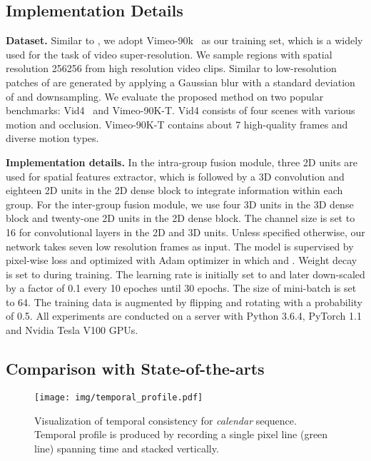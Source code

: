 \subsection{Implementation Details}
\textbf{Dataset.}
Similar to \cite{haris2019recurrent,xue2019video}, we adopt Vimeo-90k~\cite{xue2019video} as our training set, which is a widely used for the task of video super-resolution. We sample regions with spatial resolution 256256 from high resolution video clips. Similar to \cite{jo2018deep,xue2019video,yi2019progressive} low-resolution patches of  are generated by applying a Gaussian blur with a standard deviation of  and  downsampling. We evaluate the proposed method on two popular benchmarks: Vid4~\cite{liu2013bayesian} and Vimeo-90K-T\cite{xue2019video}. Vid4 consists of four scenes with various motion and occlusion. Vimeo-90K-T contains about 7 high-quality frames and diverse motion types.

\textbf{Implementation details.} 
In the intra-group fusion module, three 2D units are used for spatial features extractor, which is followed by a 3D convolution and eighteen 2D units in the 2D dense block to integrate information within each group.
For the inter-group fusion module, we use four 3D units in the 3D dense block and twenty-one 2D units in the 2D dense block. The channel size is set to 16 for convolutional layers in the 2D and 3D units. Unless specified otherwise, our network takes seven low resolution frames as input. 
The model is supervised by pixel-wise  loss and optimized with Adam \cite{kingma2014adam} optimizer in which  and . Weight decay is set to  during training. 
The learning rate is initially set to  and later down-scaled by a factor of 0.1 every 10 epoches until 30 epochs. 
The size of mini-batch is set to 64. The training data is augmented by flipping and rotating with a probability of 0.5.
All experiments are conducted on a server with Python 3.6.4, PyTorch 1.1 and Nvidia Tesla V100 GPUs.
\subsection{Comparison with State-of-the-arts}



\begin{figure}[t]
	\centering
	\texttt{[image: img/temporal\_profile.pdf]}
	\caption{Visualization of temporal consistency for \textit{calendar} sequence. Temporal profile is produced by recording a single pixel line ({\color{green}green} line) spanning time and stacked vertically.
	}
	\vspace{-5mm}
	\label{temporal-profile}
\end{figure} 


